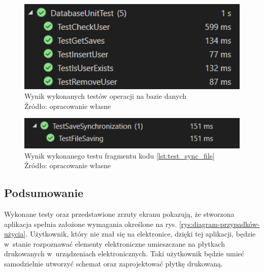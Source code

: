 \documentclass[12pt, a4paper]{article} %
\begin{document}
\newpage

\begin{figure}[h]
	\centering
	\includegraphics[width=12cm]{images/test_db.png}
	\caption{Wynik wykonanych testów operacji na bazie danych\\ Źródło: opracowanie własne}
	\label{rys:test_db}
\end{figure} 
\begin{figure}[h]
	\centering
	\includegraphics[width=12cm]{images/test_sync_file.png}
	\caption{Wynik wykonanego testu fragmentu kodu \ref{lst:test_sync_file} \\ Źródło: opracowanie własne}
	\label{rys:test_sync_file}
\end{figure} 

\subsection{Podsumowanie}
\aka Wykonane testy oraz przedstawione zrzuty ekranu pokazują, że stworzona aplikacja spełnia założone wymagania określone na rys. \ref{rys:diagram-przypadków-użycia}. Użytkownik, który nie znał się na elektronice, dzięki tej aplikacji, będzie w~stanie rozpoznawać elementy elektroniczne umieszczane na płytkach drukowanych w~urządzeniach elektronicznych. Taki użytkownik będzie umieć samodzielnie utworzyć schemat oraz zaprojektować płytkę drukowaną.


\clearpage
\end{document}
